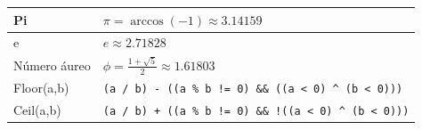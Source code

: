 \begin{center}
{\begin{tabular}{|p{}|p{}|}
Pi & $\displaystyle \pi = \arccos(-1) \approx 3.14159$ \\ \hline
e  & $\displaystyle e \approx 2.71828$ \\ \hline
Número áureo & $\displaystyle \phi = \frac{1 + \sqrt{5}}{2} \approx 1.61803$ \\ \hline

Floor(a,b) & \texttt{(a / b) - ((a \% b != 0) \&\& ((a < 0) \^{} (b < 0)))} \\ \hline
Ceil(a,b) & \texttt{(a / b) + ((a \% b != 0) \&\& !((a < 0) \^{} (b < 0)))} \\ \hline

\end{tabular}
}
\end{center}
